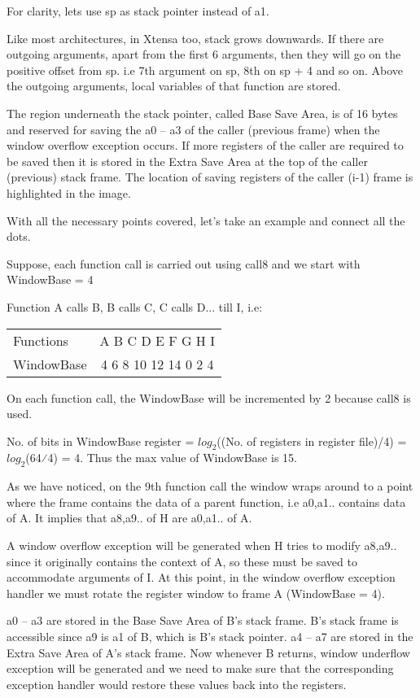 For clarity, lets use sp as stack pointer instead of a1.

Like most architectures, in Xtensa too, stack grows downwards. If there are outgoing arguments, apart from the first 6 arguments, then they will go on the positive offset from sp. i.e 7th argument on sp, 8th on sp + 4 and so on. Above the outgoing arguments, local variables of that function are stored.

The region underneath the stack pointer, called Base Save Area, is of 16 bytes and reserved for saving the a0 -- a3 of the caller (previous frame) when the window overflow exception occurs. If more registers of the caller are required to be saved then it is stored in the Extra Save Area at the top of the caller (previous) stack frame. The location of saving registers of the caller (i-1) frame is highlighted in the image.

With all the necessary points covered, let’s take an example and connect all the dots.

Suppose, each function call is carried out using call8 and we start with WindowBase = 4

Function A calls B, B calls C, C calls D... till I, i.e:

\newcommand{\calls}{\textrightarrow{}}
\begin{longtable}{lc}
Functions&  A \calls B \calls C \calls D \calls E \calls F \calls G \calls H \calls I\\
WindowBase& 4 \calls 6 \calls 8 \calls 10 \calls 12 \calls 14 \calls 0 \calls 2 \calls 4\\
\end{longtable}
\let\calls\undefined

On each function call, the WindowBase will be incremented by 2 because call8 is used.

No. of bits in WindowBase register = $log_{2}$((No. of registers in register file)/4) = $log_{2}$(64⁄4) = 4. Thus the max value of WindowBase is 15.

As we have noticed, on the 9th function call the window wraps around to a point where the frame contains the data of a parent function, i.e a0,a1.. contains data of A. It implies that a8,a9.. of H are a0,a1.. of A.

A window overflow exception will be generated when H tries to modify a8,a9.. since it originally contains the context of A, so these must be saved to accommodate arguments of I. At this point, in the window overflow exception handler we must rotate the register window to frame A (WindowBase = 4).

a0 -- a3 are stored in the Base Save Area of B’s stack frame. B’s stack frame is accessible since a9 is a1 of B, which is B’s stack pointer.
a4 -- a7 are stored in the Extra Save Area of A’s stack frame.
Now whenever B returns, window underflow exception will be generated and we need to make sure that the corresponding exception handler would restore these values back into the registers.

